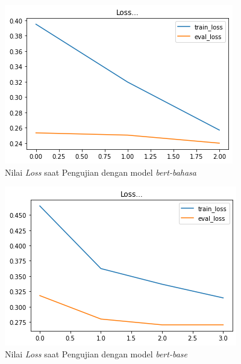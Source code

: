 \begin{figure}[h]
    \begin{center}
        \includegraphics[width= 0.9\linewidth]{gambar/loss_bert_bahasa.png}
        \caption{Nilai \textit{Loss} saat Pengujian dengan model \textit{bert-bahasa}}
        \label{fig: loss_bert_bahasa}
    \end{center}
\end{figure}

\begin{figure}[h]
    \begin{center}
        \includegraphics[width= 0.9\linewidth]{gambar/loss_bert_multilingual.png}
        \caption{Nilai \textit{Loss} saat Pengujian dengan model \textit{bert-base}}
        \label{fig: loss_bert_multilingual}
    \end{center}
\end{figure}

